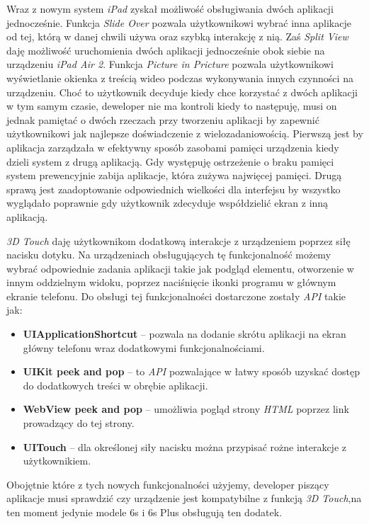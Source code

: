 \documentclass{iiuwb}
\begin{document}
Wraz z nowym system \textit{iPad} zyskał możliwość obsługiwania dwóch aplikacji jednocześnie. Funkcja \textit{Slide Over} pozwala użytkownikowi wybrać inna aplikacje od tej, którą w danej chwili używa oraz szybką interakcję z nią. Zaś \textit{Split View} daję możliwość uruchomienia dwóch aplikacji jednocześnie obok siebie na urządzeniu \textit{iPad Air 2}. Funkcja \textit{Picture in Pricture} pozwala użytkownikowi wyświetlanie okienka z treścią wideo podczas wykonywania innych czynności na urządzeniu. Choć to użytkownik decyduje kiedy chce korzystać z dwóch aplikacji w tym samym czasie, deweloper nie ma kontroli kiedy to następuję, musi on jednak pamiętać o dwóch rzeczach przy tworzeniu aplikacji by zapewnić użytkownikowi jak najlepsze doświadczenie z wielozadaniowością. Pierwszą jest by aplikacja zarządzała w efektywny sposób zasobami pamięci urządzenia kiedy dzieli system z drugą aplikacją. Gdy występuję ostrzeżenie o braku pamięci system prewencyjnie zabija aplikacje, która zużywa najwięcej pamięci. Drugą sprawą jest zaadoptowanie odpowiednich wielkości dla interfejsu by wszystko wyglądało poprawnie gdy użytkownik zdecyduje współdzielić ekran z inną aplikacją.  

\textit{3D Touch} daję użytkownikom dodatkową interakcje z urządzeniem poprzez siłę nacisku dotyku. Na urządzeniach obsługujących tę funkcjonalność możemy wybrać odpowiednie zadania aplikacji takie jak podgląd elementu, otworzenie w innym oddzielnym widoku,  poprzez naciśnięcie ikonki programu w głównym ekranie telefonu. Do obsługi tej funkcjonalności dostarczone zostały \textit{API} takie jak:
\begin{itemize}
\item \textbf{UIApplicationShortcut} -- pozwala na dodanie skrótu aplikacji na ekran główny telefonu wraz dodatkowymi funkcjonalnościami.
\item \textbf{UIKit peek and pop} -- to \textit{API} pozwalające w łatwy sposób uzyskać dostęp do dodatkowych treści w obrębie aplikacji.
\item \textbf{WebView peek and pop} -- umożliwia pogląd strony \textit{HTML} poprzez link prowadzący do tej strony.
\item \textbf{UITouch} -- dla określonej siły nacisku można przypisać rożne interakcje z użytkownikiem.
\end{itemize}
Obojętnie które z tych nowych funkcjonalności użyjemy, developer piszący aplikacje  musi sprawdzić czy urządzenie jest kompatybilne z funkcją \textit{3D Touch},na ten moment jedynie modele 6s i 6s Plus obsługują ten dodatek.
\end{document}
